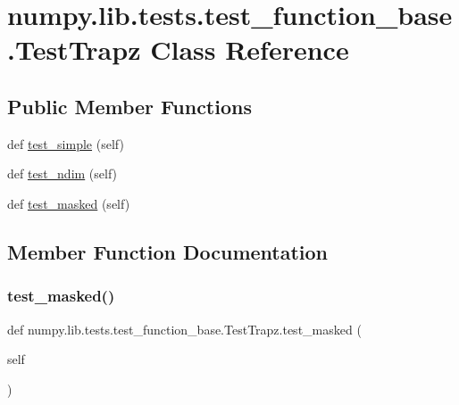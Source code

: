 \hypertarget{classnumpy_1_1lib_1_1tests_1_1test__function__base_1_1TestTrapz}{}\section{numpy.\+lib.\+tests.\+test\+\_\+function\+\_\+base.\+Test\+Trapz Class Reference}
\label{classnumpy_1_1lib_1_1tests_1_1test__function__base_1_1TestTrapz}
\subsection*{Public Member Functions}
\begin{DoxyCompactItemize}
\item 
def \hyperlink{classnumpy_1_1lib_1_1tests_1_1test__function__base_1_1TestTrapz_a5114860c031804da5c9ba91ba0107d1c}{test\+\_\+simple} (self)
\item 
def \hyperlink{classnumpy_1_1lib_1_1tests_1_1test__function__base_1_1TestTrapz_a12c26e594ae7bd5226e6293e42c5dac3}{test\+\_\+ndim} (self)
\item 
def \hyperlink{classnumpy_1_1lib_1_1tests_1_1test__function__base_1_1TestTrapz_afa006b14320c91bfe3ce440d91bf3a75}{test\+\_\+masked} (self)
\end{DoxyCompactItemize}


\subsection{Member Function Documentation}
\mbox{\label{classnumpy_1_1lib_1_1tests_1_1test__function__base_1_1TestTrapz_afa006b14320c91bfe3ce440d91bf3a75}} 
\subsubsection{\texorpdfstring{test\+\_\+masked()}{test\_masked()}}
{\footnotesize\ttfamily def numpy.\+lib.\+tests.\+test\+\_\+function\+\_\+base.\+Test\+Trapz.\+test\+\_\+masked (\begin{DoxyParamCaption}\item[{}]{self }\end{DoxyParamCaption})}

